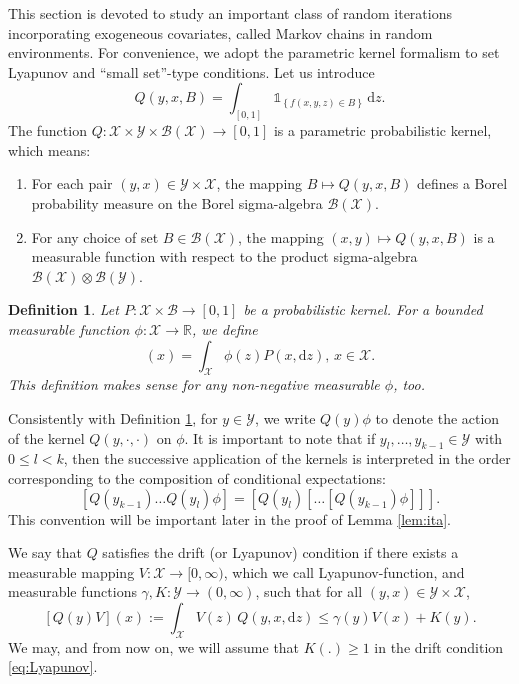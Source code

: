 \documentclass[a4paper,10pt]{article}
\newtheorem{definition}[theorem]{Definition}
\newcommand{\R}{\mathbb{R}}
\newcommand{\B}{\mathcal{B}}
\newcommand{\X}{\mathcal{X}}
\newcommand{\Y}{\mathcal{Y}}
\newcommand{\ind}{\mathds{1}}
\newcommand{\ga}{\gamma}
\newcommand{\dint}{\mathrm{d}}  %
\begin{document}
This section is devoted to study an important class of random iterations incorporating exogeneous covariates, called Markov chains in random environments. For convenience, we adopt the parametric kernel formalism to set Lyapunov and ``small set''-type conditions. Let us introduce $$Q(y,x,B)=\int_{[0,1]}\ind_{\left\{f(x,y,z)\in B\right\}}\,\dint z.$$ 
The function $Q:\X\times\Y\times\B (\X)\to [0,1]$ is a parametric probabilistic kernel, which means:
\begin{enumerate}[i]
	\item For each pair $(y, x) \in \Y \times \X$, the mapping $B \mapsto Q(y, x, B)$ defines a Borel probability measure on the Borel sigma-algebra $\B(\X)$.
	
	\item For any choice of set $B \in \B(\X)$, the mapping $(x, y) \mapsto Q(y, x, B)$ is a measurable function with respect to the product sigma-algebra $\B(\X) \otimes \B(\Y)$.
\end{enumerate}

\begin{definition}\label{def:act}
	Let $P:\X\times\B\to [0,1]$ be a probabilistic kernel. For
	a bounded measurable function $\phi:\X\to\R$, we define
	\begin{equation*}
	[P\phi](x)=\int_\X \phi(z) P(x,\dint z),\,x\in\X.
	\end{equation*}
	This definition makes sense for any non-negative measurable $\phi$, too.
\end{definition}
Consistently with Definition \ref{def:act}, for $y \in \Y$, we write $Q(y)\phi$ to denote the action of the kernel $Q(y,\cdot,\cdot)$ on $\phi$. It is important to note that if $y_l, \ldots, y_{k-1} \in \Y$ with $0 \le l < k$, then the successive application of the kernels is interpreted in the order corresponding to the composition of conditional expectations:
\[
[Q(y_{k-1})\ldots Q(y_l)\phi] = [Q(y_l)[\ldots [Q(y_{k-1})\phi]]].
\]
This convention will be important later in the proof of Lemma \ref{lem:ita}.

We say that $Q$ satisfies the drift (or Lyapunov) condition if there exists a measurable mapping $V:\X\to [0,\infty)$, which we call Lyapunov-function, and measurable functions $\ga,K:\Y\to (0,\infty)$, such that for all $(y,x)\in\Y\times\X$,
\begin{equation}\label{eq:Lyapunov}
[Q(y)V](x):=\int_{\X}V(z)\,Q(y,x,\dint z)\le \ga (y)V(x)+K(y).
\end{equation}
We may, and from now on, we will assume that $K(.)\ge 1$ in the drift condition \eqref{eq:Lyapunov}.
\end{document}
